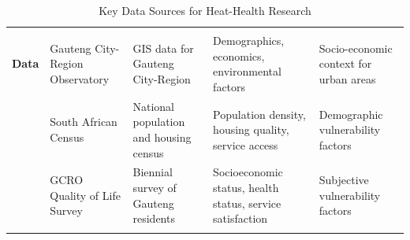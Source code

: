 \documentclass[12pt,a4paper,landscape]{article}
\begin{document}
\begin{longtable}{p{3cm}p{4cm}p{5cm}p{4cm}p{4cm}}
\begin{tabular}{c}\textbf{Socio-Economic}\\\textbf{Data}\end{tabular} 
& Gauteng City-Region Observatory 
& GIS data for Gauteng City-Region 
& Demographics, economics, environmental factors 
& Socio-economic context for urban areas \\
\cmidrule{2-5}
& South African Census 
& National population and housing census 
& Population density, housing quality, service access 
& Demographic vulnerability factors \\
\cmidrule{2-5}
& GCRO Quality of Life Survey 
& Biennial survey of Gauteng residents 
& Socioeconomic status, health status, service satisfaction 
& Subjective vulnerability factors \\
\bottomrule
\caption{Key Data Sources for Heat-Health Research}
\end{longtable}
\clearpage
\end{document}
